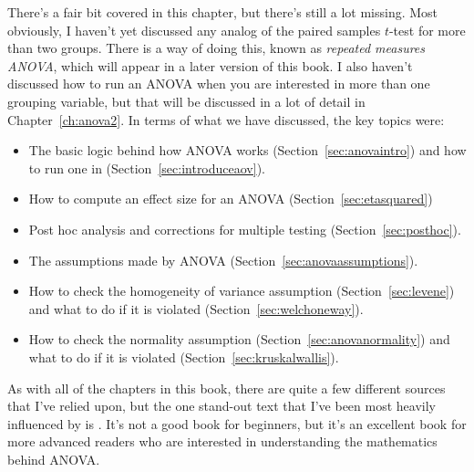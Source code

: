 There's a fair bit covered in this chapter, but there's still a lot missing. Most obviously, I haven't yet discussed any analog of the paired samples $t$-test for more than two groups. There is a way of doing this, known as {\it repeated measures ANOVA}, which will appear in a later version of this book. I also haven't discussed how to run an ANOVA when you are interested in more than one grouping variable, but that will be discussed in a lot of detail in Chapter~\ref{ch:anova2}. In terms of what we have discussed, the key topics were:

\begin{itemize} \itemsep -2pt
\item The basic logic behind how ANOVA works (Section~\ref{sec:anovaintro}) and how to run one in \R (Section~\ref{sec:introduceaov}).
\item How to compute an effect size for an ANOVA (Section~\ref{sec:etasquared})
\item Post hoc analysis and corrections for multiple testing (Section~\ref{sec:posthoc}).
\item The assumptions made by ANOVA (Section~\ref{sec:anovaassumptions}).
\item How to check the homogeneity of variance assumption (Section~\ref{sec:levene}) and what to do if it is violated (Section~\ref{sec:welchoneway}).
\item How to check the normality assumption (Section~\ref{sec:anovanormality}) and what to do if it is violated (Section~\ref{sec:kruskalwallis}).
\end{itemize}

As with all of the chapters in this book, there are quite a few different sources that I've relied upon, but the one stand-out text that I've been most heavily influenced by is . It's not a good book for beginners, but it's an excellent book for more advanced readers who are interested in understanding the mathematics behind ANOVA. 




